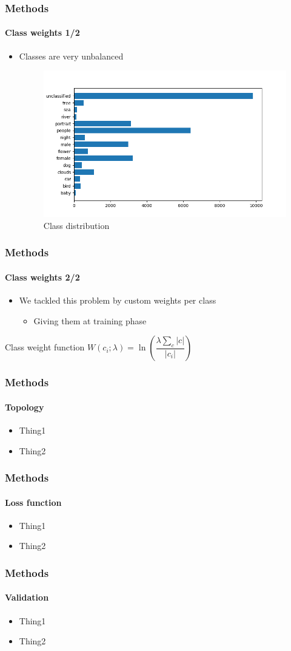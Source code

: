 \begin{frame}
	\frametitle{Methods}
	\framesubtitle{Class weights 1/2}
	\begin{itemize}
		\item Classes are very unbalanced
		\begin{figure}[h]
		\includegraphics[height=0.6\textheight]{images/label_distribution.png}
		\caption{Class distribution}
		\end{figure}
	\end{itemize}
\end{frame}

\begin{frame}
	\frametitle{Methods}
	\framesubtitle{Class weights 2/2}
	\begin{itemize}
			\item We tackled this problem by custom weights per class
			\begin{itemize}
				\item Giving them at training phase
			\end{itemize}
		\end{itemize}
	\begin{block}{Class weight function}
		$W(c_i;\lambda) = \ln\left(\dfrac{\lambda \sum_{c}|c|}{|c_i|}\right)$
	\end{block}
\end{frame}

\begin{frame}
	\frametitle{Methods}
	\framesubtitle{Topology}
	\begin{itemize}
		\item Thing1
		\item Thing2
	\end{itemize}
\end{frame}

\begin{frame}
	\frametitle{Methods}
	\framesubtitle{Loss function}
	\begin{itemize}
		\item Thing1
		\item Thing2
	\end{itemize}
\end{frame}

\begin{frame}
	\frametitle{Methods}
	\framesubtitle{Validation}
	\begin{itemize}
		\item Thing1
		\item Thing2
	\end{itemize}
\end{frame}